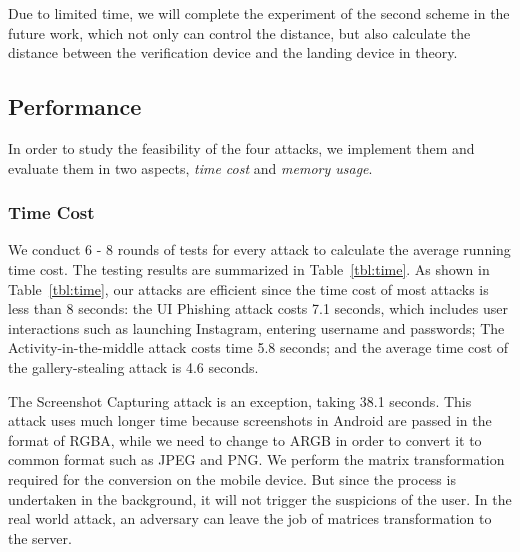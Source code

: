 Due to limited time, we will complete the experiment of the second scheme in the future work, which not only can control the distance, but also calculate the distance between the verification device and the landing device in theory.


\iffalse
\subsection{Performance}
\label{sec:performance}

In order to study the feasibility of the four attacks, we implement them and evaluate them in
two aspects, \emph{time cost} and \emph{memory usage}.


\subsubsection{Time Cost}
We conduct 6 - 8 rounds of tests for every attack to calculate the average
running time cost. The testing results are summarized
in Table~\ref{tbl:time}. As shown in Table~\ref{tbl:time}, our attacks
are efficient since the time cost of most attacks is less than 8 seconds:
the UI Phishing attack costs 7.1 seconds, which includes user
interactions such as launching Instagram, entering username and
passwords; The Activity-in-the-middle attack costs time 5.8 seconds; and
the average time cost of the gallery-stealing attack is 4.6 seconds.

The Screenshot Capturing attack is an exception, taking 38.1
seconds. This attack uses much longer time because screenshots in
Android are passed in the format of RGBA, while we need to change to
ARGB in order to convert it to common format such as JPEG and PNG.
We perform the matrix transformation required for the conversion on
the mobile device.
But since the process is undertaken in the background, it will
not trigger the suspicions of the user. In the real world attack, an
adversary can leave the job of matrices transformation to the server.

